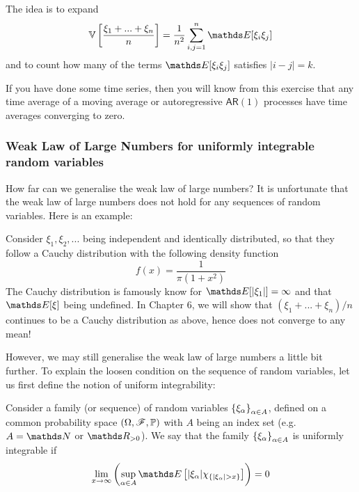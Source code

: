 \begin{hint}
The idea is to expand 
\begin{equation}
\V\sqbracket{\frac{\xi_1 + ... + \xi_n}{n}} = \frac{1}{n^2} \sum_{i,j=1}^n \E[\xi_i \xi_j]
\end{equation}
and to count how many of the terms $\E[\xi_i \xi_j]$ satisfies $|i-j|=k$. 
\end{hint}

If you have done some time series, then you will know from this exercise that any time average of a moving average or autoregressive $\mathsf{AR}(1)$ processes have time averages converging to zero. 

\begin{unexaminable}
\subsubsection{Weak Law of Large Numbers for uniformly integrable random variables}
How far can we generalise the weak law of large numbers? It is unfortunate that the weak law of large numbers does not hold for any sequences of random variables. Here is an example:
\begin{example}
Consider $\xi_1, \xi_2, ...$ being independent and identically distributed, so that they follow a Cauchy distribution with the following density function
\begin{equation}
f(x) = \frac{1}{\pi(1+x^2)}
\end{equation}
The Cauchy distribution is famously know for $\E[|\xi_1|] = \infty$ and that $\E[\xi]$ being undefined. In Chapter 6, we will show that $(\xi_1 + ... + \xi_n)/n$ continues to be a Cauchy distribution as above, hence does not converge to any mean!
\end{example}

However, we may still generalise the weak law of large numbers a little bit further. To explain the loosen condition on the sequence of random variables, let us first define the notion of uniform integrability:
\begin{definition}
Consider a family (or sequence) of random variables $\left\{ \xi_\alpha \right \}_{\alpha \in A}$, defined on a common probability space $(\Omega,\mathcal{F},\mathbb{P})$ with $A$ being an index set (e.g. $A = \N$ or $\R_{>0}$). We say that the family $\left\{ \xi_\alpha \right \}_{\alpha \in A}$ is uniformly integrable if 
\begin{equation}
    \lim_{x \to \infty} \bracket{\sup_{\alpha \in A} \E\sqbracket{|\xi_\alpha| \chi_{\set{|\xi_\alpha| > x}}}} = 0
\end{equation}
\end{definition}


\end{unexaminable}
